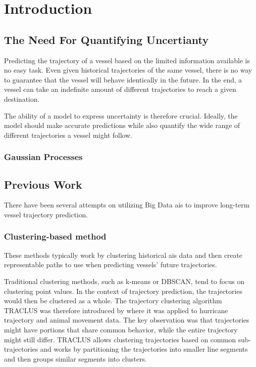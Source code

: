 \chapter{Introduction}
\section{The Need For Quantifying Uncertianty}
Predicting the trajectory of a vessel based on the limited information available is no easy task. Even given historical trajectories of the same vessel, there is no way to guarantee that the vessel will behave identically in the future. In the end, a vessel can take an indefinite amount of different trajectories to reach a given destination. 

The ability of a model to express uncertainty is therefore crucial. Ideally, the model should make accurate predictions while also quantify the wide range of different trajectories a vessel might follow. 

\subsection{Gaussian Processes}
\section{Previous Work}
There have been several attempts on utilizing Big Data \acrshort{ais} to improve long-term vessel trajectory prediction. 

\subsection{Clustering-based method}
These methods typically work by clustering historical \acrshort{ais} data and then create representable paths to use when predicting vessels' future trajectories. 


Traditional clustering methods, such as k-means or DBSCAN, tend to focus on clustering point values. In the context of trajectory prediction, the trajectories would then be clustered as a whole. The trajectory clustering algorithm TRACLUS was therefore introduced by \cite{traclus} where it was applied to hurricane trajectory and animal movement data. The key observation was that trajectories might have portions that share common behavior, while the entire trajectory might still differ. TRACLUS allows clustering trajectories based on common sub-trajectories and works by partitioning the trajectories into smaller line segments and then groups similar segments into clusters.  







